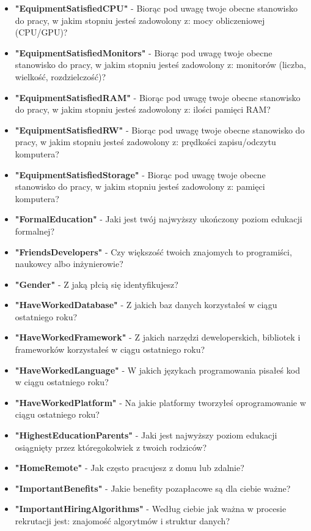 \begin{appendices}
\begin{itemize}
        \item \textbf{"EquipmentSatisfiedCPU"} - Biorąc pod uwagę twoje obecne stanowisko do pracy, w jakim stopniu jesteś zadowolony z: mocy obliczeniowej (CPU/GPU)?
        \item \textbf{"EquipmentSatisfiedMonitors"} - Biorąc pod uwagę twoje obecne stanowisko do pracy, w jakim stopniu jesteś zadowolony z: monitorów (liczba, wielkość, rozdzielczość)?
        \item \textbf{"EquipmentSatisfiedRAM"} - Biorąc pod uwagę twoje obecne stanowisko do pracy, w jakim stopniu jesteś zadowolony z: ilości pamięci RAM?
        \item \textbf{"EquipmentSatisfiedRW"} - Biorąc pod uwagę twoje obecne stanowisko do pracy, w jakim stopniu jesteś zadowolony z: prędkości zapisu/odczytu komputera?
        \item \textbf{"EquipmentSatisfiedStorage"} - Biorąc pod uwagę twoje obecne stanowisko do pracy, w jakim stopniu jesteś zadowolony z: pamięci komputera?
        \item \textbf{"FormalEducation"} - Jaki jest twój najwyższy ukończony poziom edukacji formalnej?
        \item \textbf{"FriendsDevelopers"} - Czy większość twoich znajomych to programiści, naukowcy albo inżynierowie?
        \item \textbf{"Gender"} - Z jaką płcią się identyfikujesz?
        \item \textbf{"HaveWorkedDatabase"} - Z jakich baz danych korzystałeś w ciągu ostatniego roku?
        \item \textbf{"HaveWorkedFramework"} - Z jakich narzędzi deweloperskich, bibliotek i frameworków korzystałeś w ciągu ostatniego roku?
        \item \textbf{"HaveWorkedLanguage"} - W jakich językach programowania pisałeś kod w ciągu ostatniego roku?
        \item \textbf{"HaveWorkedPlatform"} - Na jakie platformy tworzyłeś oprogramowanie w ciągu ostatniego roku?
        \item \textbf{"HighestEducationParents"} - Jaki jest najwyższy poziom edukacji osiągnięty przez któregokolwiek z twoich rodziców?
        \item \textbf{"HomeRemote"} - Jak często pracujesz z domu lub zdalnie?
        \item \textbf{"ImportantBenefits"} - Jakie benefity pozapłacowe są dla ciebie ważne?
        \item \textbf{"ImportantHiringAlgorithms"} - Według ciebie jak ważna w procesie rekrutacji jest: znajomość algorytmów i struktur danych?

\end{itemize}
\end{appendices}
